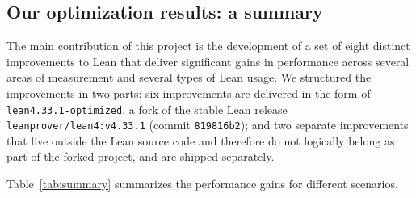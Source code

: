 \documentclass{article}
\newcommand{\Lean}{Lean\xspace}      %
\newcommand{\altlean}{\texttt{lean4.33.1-\allowbreak optimized}\xspace}
\begin{document}
\subsection{Our optimization results: a summary}
\label{sec:intro-results}

The main contribution of this project is the development of a set of eight distinct improvements to \Lean that deliver significant gains in performance across several areas of measurement and several types of \Lean usage. We structured the improvements in two parts: six improvements are delivered in the form of \altlean, a fork of the stable \Lean release \texttt{leanprover/lean4:v4.33.1} (commit \texttt{819816b2}); and two separate improvements that live outside the \Lean source code and therefore do not logically belong as part of the forked project, and are shipped separately.

 Table~\ref{tab:summary} summarizes the performance gains for different scenarios.
\end{document}
